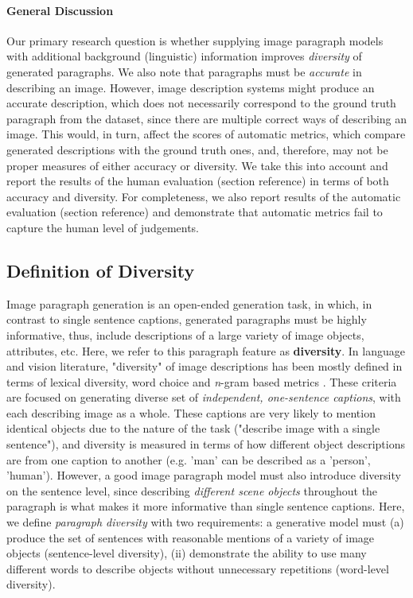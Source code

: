 \documentclass[11pt,a4paper]{article}
\begin{document}
\paragraph{General Discussion}
Our primary research question is whether supplying image paragraph models with additional background (linguistic) information improves \textit{diversity} of generated paragraphs.
We also note that paragraphs must be \textit{accurate} in describing an image.
However, image description systems might produce an accurate description, which does not necessarily correspond to the ground truth paragraph from the dataset, since there are multiple correct ways of describing an image.
This would, in turn, affect the scores of automatic metrics, which compare generated descriptions with the ground truth ones, and, therefore, may not be proper measures of either accuracy or diversity.
We take this into account and report the results of the human evaluation (section reference) in terms of both accuracy and diversity.
For completeness, we also report results of the automatic evaluation (section reference) and demonstrate that automatic metrics fail to capture the human level of judgements.

\subsection{Definition of Diversity}
Image paragraph generation is an open-ended generation task, in which, in contrast to single sentence captions, generated paragraphs must be highly informative, thus, include descriptions of a large variety of image objects, attributes, etc.
Here, we refer to this paragraph feature as \textbf{diversity}.
In language and vision literature, "diversity" of image descriptions has been mostly defined in terms of lexical diversity, word choice and \textit{n}-gram based metrics \cite{Devlin2015, Vijayakumar2016, Lindh2018, VanMiltenburg2018}.
These criteria are focused on generating diverse set of \textit{independent, one-sentence captions}, with each describing image as a whole.
These captions are very likely to mention identical objects due to the nature of the task ("describe image with a single sentence"), and diversity is measured in terms of how different object descriptions are from one caption to another (e.g. 'man' can be described as a 'person', 'human').
However, a good image paragraph model must also introduce diversity on the sentence level, since describing \textit{different scene objects} throughout the paragraph is what makes it more informative than single sentence captions.
Here, we define \textit{paragraph diversity} with two requirements: a generative model must (a) produce the set of sentences with reasonable mentions of a variety of image objects (sentence-level diversity), (ii) demonstrate the ability to use many different words to describe objects without unnecessary repetitions (word-level diversity).
\fi
\end{document}
